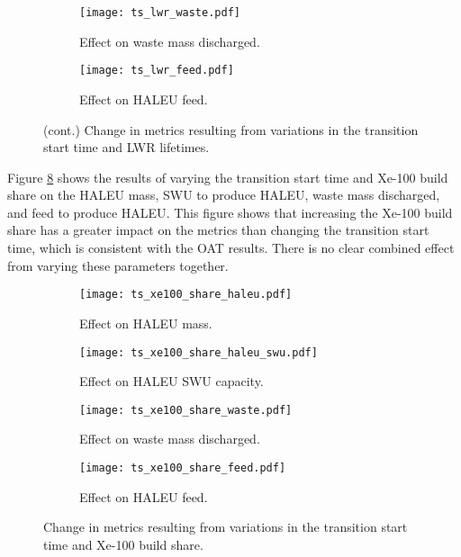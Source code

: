 \begin{figure}
    \ContinuedFloat    
    \begin{subfigure}[h!]{0.48\textwidth}
        \centering
        \texttt{[image: ts\_lwr\_waste.pdf]}
        \caption{Effect on waste mass discharged.}
        \label{fig:ts_lwr_waste}
    \end{subfigure}
    \hfill
    \begin{subfigure}[h!]{0.48\textwidth}
        \centering
        \texttt{[image: ts\_lwr\_feed.pdf]}
        \caption{Effect on HALEU feed.}
        \label{fig:ts_lwr_feed}
    \end{subfigure}
    \caption{(cont.) Change in metrics resulting from variations in the 
    transition start time and LWR lifetimes.}
    \label{fig:ts_lwr}
\end{figure}

Figure \ref{fig:ts_xe100_share} shows the results of varying the 
transition start time and Xe-100 build share on the \gls{HALEU} mass, 
\gls{SWU} to produce \gls{HALEU}, waste mass discharged, and feed 
to produce \gls{HALEU}. This figure shows that increasing the 
Xe-100 build share has a greater impact on the metrics than 
changing the transition start time, which is consistent with the 
\gls{OAT} results. There is no clear combined effect from varying these 
parameters together. 

\begin{figure}
    \begin{subfigure}[h!]{0.48\textwidth}
        \centering
        \texttt{[image: ts\_xe100\_share\_haleu.pdf]}
        \caption{Effect on HALEU mass.}
        \label{fig:ts_xe100_share_haleu}
    \end{subfigure}
    \begin{subfigure}[h!]{0.48\textwidth}
        \centering
        \texttt{[image: ts\_xe100\_share\_haleu\_swu.pdf]}
        \caption{Effect on HALEU SWU capacity.}
        \label{fig:ts_xe100_share_haleu_swu}
    \end{subfigure}
    
    \begin{subfigure}[h!]{0.48\textwidth}
        \centering
        \texttt{[image: ts\_xe100\_share\_waste.pdf]}
        \caption{Effect on waste mass discharged.}
        \label{fig:ts_xe100_share_waste}
    \end{subfigure}
    \hfill
    \begin{subfigure}[h!]{0.48\textwidth}
        \centering
        \texttt{[image: ts\_xe100\_share\_feed.pdf]}
        \caption{Effect on HALEU feed.}
        \label{fig:ts_xe100_share_feed}
    \end{subfigure}
    \caption{Change in metrics resulting from variations in the 
    transition start time and Xe-100 build share.}
    \label{fig:ts_xe100_share}
\end{figure}

